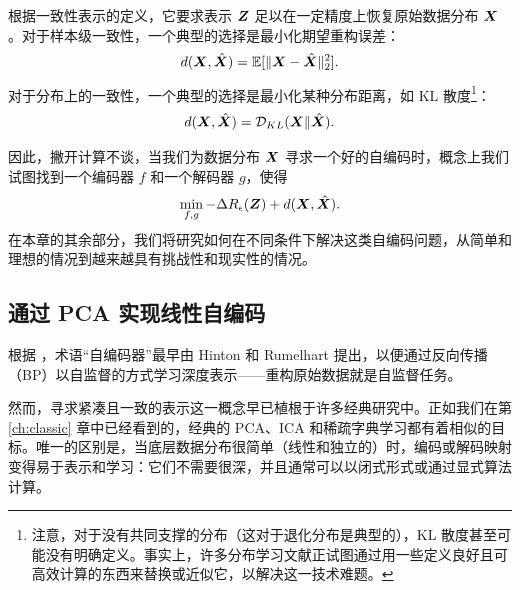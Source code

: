 \documentclass[../../book-main.tex]{subfiles}
\begin{document}
根据一致性表示的定义，它要求表示 $\bm{Z}$ 足以在一定精度上恢复原始数据分布 $\bm{X}$。对于样本级一致性，一个典型的选择是最小化期望重构误差：
\begin{equation}
  d(\bm{X}, \hat {\bm{X}}) = \mathbb{E}[\|\bm{X} - \hat{\bm{X}}\|_2^2].
\end{equation}
对于分布上的一致性，一个典型的选择是最小化某种分布距离，如 KL 散度\footnote{注意，对于没有共同支撑的分布（这对于退化分布是典型的），KL 散度甚至可能没有明确定义。事实上，许多分布学习文献正试图通过用一些定义良好且可高效计算的东西来替换或近似它，以解决这一技术难题。}：
\begin{equation}
  d(\bm{X}, \hat {\bm{X}}) = \mathcal{D}_{KL}(\bm{X}\|\hat{\bm{X}}).
\end{equation}

因此，撇开计算不谈，当我们为数据分布 $\bm{X}$ 寻求一个好的自编码时，概念上我们试图找到一个编码器 $f$ 和一个解码器 $g$，使得
\begin{equation}
  \min_{f, g} - \Delta R_{\epsilon}(\bm{Z}) + d(\bm{X}, \hat {\bm{X}}).
  \label{eqn:autoencode-objective-ch5}
\end{equation}
在本章的其余部分，我们将研究如何在不同条件下解决这类自编码问题，从简单和理想的情况到越来越具有挑战性和现实性的情况。


\subsection{通过 PCA 实现线性自编码}
根据 \cite{Baldi2011}，术语“自编码器”最早由 Hinton 和 Rumelhart \cite{Rumelhart1986} 提出，以便通过反向传播（BP）以自监督的方式学习深度表示——重构原始数据就是自监督任务。

然而，寻求紧凑且一致的表示这一概念早已植根于许多经典研究中。正如我们在第 \ref{ch:classic} 章中已经看到的，经典的 PCA、ICA 和稀疏字典学习都有着相似的目标。唯一的区别是，当底层数据分布很简单（线性和独立的）时，编码或解码映射变得易于表示和学习：它们不需要很深，并且通常可以以闭式形式或通过显式算法计算。
\end{document}
